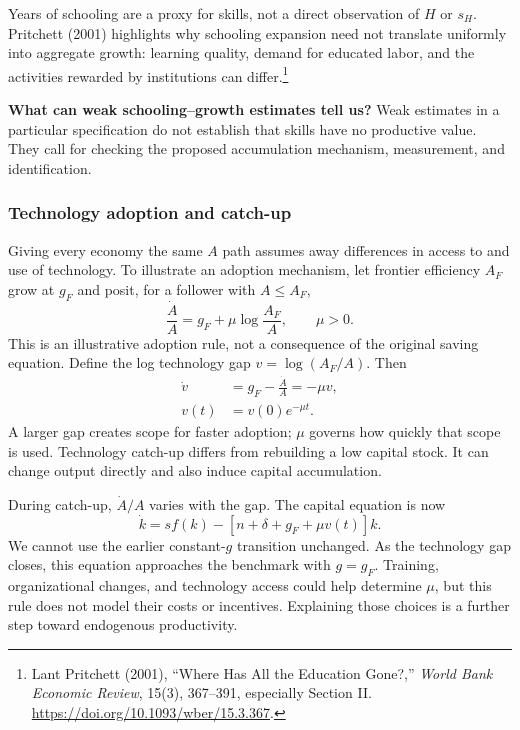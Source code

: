 Years of schooling are a proxy for skills, not a direct observation of $H$ or
$s_H$. Pritchett (2001) highlights why schooling expansion need not translate
uniformly into aggregate growth: learning quality, demand for educated labor,
and the activities rewarded by institutions can differ.\footnote{Lant
Pritchett (2001), ``Where Has All the Education Gone?,'' \textit{World Bank
Economic Review}, 15(3), 367--391, especially Section II.
\url{https://doi.org/10.1093/wber/15.3.367}.}
\begin{greenblock}
\textbf{What can weak schooling--growth estimates tell us?}
Weak estimates in a particular specification do not establish that skills have
no productive value. They call for checking the proposed accumulation
mechanism, measurement, and identification.
\end{greenblock}

\subsubsection{Technology adoption and catch-up}

Giving every economy the same $A$ path assumes away differences in access to
and use of technology. To illustrate an adoption mechanism, let frontier
efficiency $A_F$ grow at $g_F$ and posit, for a follower with $A\leq A_F$,
\begin{equation}
\frac{\dot A}{A}=g_F+\mu\log\frac{A_F}{A},\qquad \mu>0.
\end{equation}
This is an illustrative adoption rule, not a consequence of the original
saving equation. Define the log technology gap $v=\log(A_F/A)$. Then
\begin{align}
\dot v&=g_F-\frac{\dot A}{A}=-\mu v,\\
v(t)&=v(0)e^{-\mu t}.
\end{align}
A larger gap creates scope for faster adoption; $\mu$ governs how quickly that
scope is used. Technology catch-up differs from rebuilding a low capital stock.
It can change output directly and also induce capital accumulation.

During catch-up, $\dot A/A$ varies with the gap. The capital equation is now
\begin{equation}
\dot k=sf(k)-\left[n+\delta+g_F+\mu v(t)\right]k.
\end{equation}
We cannot use the earlier constant-$g$ transition unchanged. As the technology
gap closes, this equation approaches the benchmark with $g=g_F$.
Training, organizational changes, and technology access could help determine
$\mu$, but this rule does not model their costs or incentives. Explaining those
choices is a further step toward endogenous productivity.

